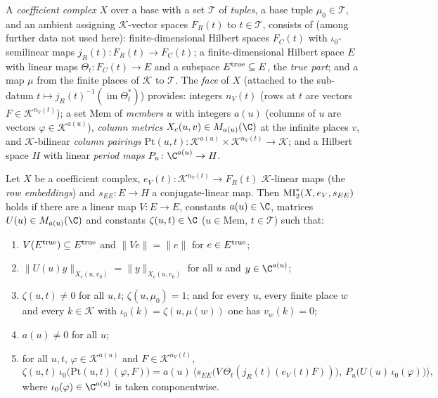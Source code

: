 \begin{definition}\label{pf:open0a:def:cx}
A \emph{coefficient complex} $X$ over a base with a set $\mathcal T$ of \emph{tuples}, a base tuple
$\mu_0\in\mathcal T$, and an ambient assigning $\mathcal{K}$-vector spaces $F_R(t)$ to $t\in\mathcal T$, consists of
(among further data not used here): finite-dimensional Hilbert spaces $F_C(t)$ with $\iota_0$-semilinear maps
$j_R(t)\colon F_R(t)\to F_C(t)$; a finite-dimensional Hilbert space $E$ with linear maps $\Theta_t\colon F_C(t)\to E$
and a subspace $E^{\mathrm{true}}\subseteq E$, the \emph{true part}; and a map $\mu$ from the finite places of
$\mathcal{K}$ to $\mathcal T$. The \emph{face} of $X$ (attached to the sub-datum $t\mapsto
j_R(t)^{-1}(\operatorname{im}\Theta_t^*)$) provides: integers $n_V(t)$ (rows at $t$ are vectors
$F\in\mathcal{K}^{n_V(t)}$); a set $\mathrm{Mem}$ of \emph{members} $u$ with integers $a(u)$ (columns of $u$ are
vectors $\varphi\in\mathcal{K}^{a(u)}$), \emph{column metrics} $X_c(u,v)\in M_{a(u)}(\C)$ at the infinite places $v$,
and $\mathcal{K}$-bilinear \emph{column pairings}
$\mathrm{Pt}(u,t)\colon\mathcal{K}^{a(u)}\times\mathcal{K}^{n_V(t)}\to\mathcal{K}$; and a Hilbert space $H$ with
linear \emph{period maps} $P_u\colon\C^{a(u)}\to H$.
\end{definition}

\begin{definition}\label{pf:open0a:def:mistar}
Let $X$ be a coefficient complex, $e_V(t)\colon\mathcal{K}^{n_V(t)}\to F_R(t)$ $\mathcal{K}$-linear maps (the
\emph{row embeddings}) and $s_{EE}\colon E\to H$ a conjugate-linear map. Then $\mathrm{MI}^{*}_{2}(X,e_V,s_{EE})$ holds if
there are a linear map $V\colon E\to E$, constants $a(u)\in\C$, matrices $U(u)\in M_{a(u)}(\C)$ and constants
$\zeta(u,t)\in\C$ ($u\in\mathrm{Mem}$, $t\in\mathcal T$) such that:
\begin{enumerate}[label=(M\arabic*)]
\item\label{pf:open0a:M1} $V(E^{\mathrm{true}})\subseteq E^{\mathrm{true}}$ and $\|Ve\|=\|e\|$ for $e\in E^{\mathrm{true}}$;
\item\label{pf:open0a:M2} $\|U(u)y\|_{X_c(u,v_0)}=\|y\|_{X_c(u,v_0)}$ for all $u$ and $y\in\C^{a(u)}$;
\item\label{pf:open0a:M3} $\zeta(u,t)\ne0$ for all $u,t$; $\zeta(u,\mu_0)=1$; and for every $u$, every finite place $w$
and every $k\in\mathcal{K}$ with $\iota_0(k)=\zeta(u,\mu(w))$ one has $v_w(k)=0$;
\item\label{pf:open0a:M4} $a(u)\ne0$ for all $u$;
\item\label{pf:open0a:M5} for all $u,t$, $\varphi\in\mathcal{K}^{a(u)}$ and $F\in\mathcal{K}^{n_V(t)}$,
\begin{equation}\label{pf:open0a:eq:MI}
\zeta(u,t)\,\iota_0\bigl(\mathrm{Pt}(u,t)(\varphi,F)\bigr)
=a(u)\,\bigl\langle s_{EE}\bigl(V\,\Theta_t(j_R(t)(e_V(t)F))\bigr),\ P_u\bigl(U(u)\,\iota_0(\varphi)\bigr)\bigr\rangle ,
\end{equation}
where $\iota_0(\varphi)\in\C^{a(u)}$ is taken componentwise.
\end{enumerate}
\end{definition}

